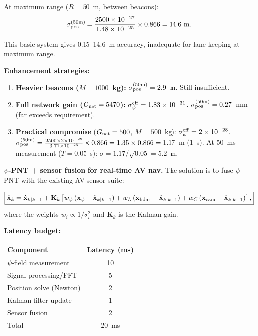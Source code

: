 \documentclass[aps,prd,twocolumn,superscriptaddress,nofootinbib]{revtex4-2}
\newcommand{\xvec}{\mathbf{x}}
\begin{document}
At maximum range ($R = 50$~m, between beacons):
\begin{equation}
\sigma_{\rm pos}^{(50\text{m})} = \frac{2500\times 10^{-27}}
{1.48\times10^{-25}}\times 0.866 = 14.6~\text{m}.
\end{equation}

This basic system gives 0.15--14.6~m accuracy, inadequate for lane
keeping at maximum range.

\textbf{Enhancement strategies:}
\begin{enumerate}
\item \textbf{Heavier beacons ($M = 1000$~kg):}
$\sigma_{\rm pos}^{(50\text{m})} = 2.9$~m.  Still insufficient.

\item \textbf{Full network gain ($G_{\rm net} = 5470$):}
$\sigma_\psi^{\rm eff} = 1.83\times10^{-31}$.
$\sigma_{\rm pos}^{(50\text{m})} = 0.27$~mm (far exceeds requirement).

\item \textbf{Practical compromise} ($G_{\rm net} = 500$,
$M = 500$~kg):
$\sigma_\psi^{\rm eff} = 2\times10^{-28}$.
$\sigma_{\rm pos}^{(50\text{m})} = \frac{2500\times 2\times10^{-28}}
{3.71\times10^{-25}}\times 0.866
= 1.35\times 0.866 = 1.17$~m (1~s).
At 50~ms measurement ($T = 0.05$~s):
$\sigma = 1.17/\sqrt{0.05} = 5.2$~m.
\end{enumerate}

\textbf{$\psi$-PNT + sensor fusion for real-time AV nav.}
The solution is to fuse $\psi$-PNT with the existing AV sensor suite:

\begin{equation}
\boxed{
\hat{\xvec}_k = \hat{\xvec}_{k|k-1} + \mathbf{K}_k\left[
w_\psi\,(\xvec_\psi - \hat{\xvec}_{k|k-1})
+ w_L\,(\xvec_{\rm lidar} - \hat{\xvec}_{k|k-1})
+ w_C\,(\xvec_{\rm cam} - \hat{\xvec}_{k|k-1})
\right],
}
\label{eq:av-fusion}
\end{equation}
where the weights $w_i \propto 1/\sigma_i^2$ and $\mathbf{K}_k$ is the
Kalman gain.

\textbf{Latency budget:}
\begin{center}
\begin{tabular}{lc}
\toprule
Component & Latency (ms) \\
\midrule
$\psi$-field measurement & 10 \\
Signal processing/FFT & 5 \\
Position solve (Newton) & 2 \\
Kalman filter update & 1 \\
Sensor fusion & 2 \\
\midrule
Total & 20~ms \\
\bottomrule
\end{tabular}
\end{center}
\end{document}
